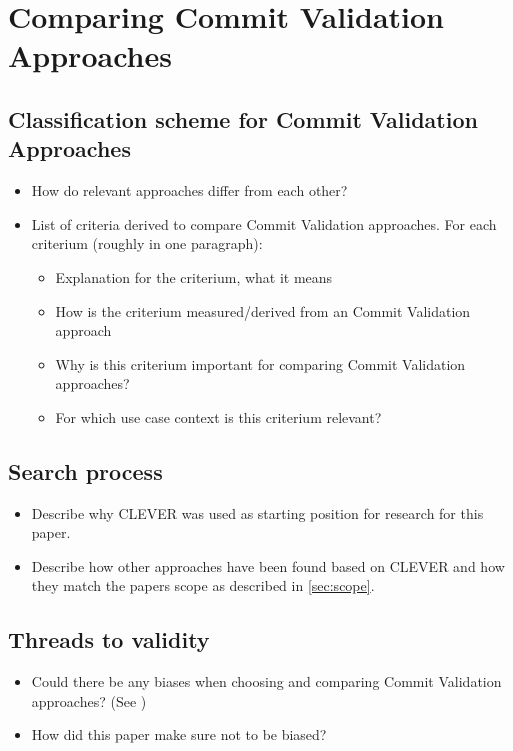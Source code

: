 

\section{Comparing Commit Validation Approaches}

\subsection{Classification scheme for Commit Validation Approaches}
\label{sec:scheme}
\begin{itemize}
	\item How do relevant approaches differ from each other?
	\item List of criteria derived to compare Commit Validation approaches. For each criterium (roughly in one paragraph):
	\begin{itemize}
		\item Explanation for the criterium, what it means
		\item How is the criterium measured/derived from an Commit Validation approach
		\item Why is this criterium important for comparing Commit Validation approaches?
		\item For which use case context is this criterium relevant?
	\end{itemize}
	
\end{itemize}

\subsection{Search process}
\begin{itemize}
	\item Describe why CLEVER was used as starting position for research for this paper. \cite{Nayrolles2018}
	\item Describe how other approaches have been found based on CLEVER and how they match the papers scope as described in \ref{sec:scope}.
\end{itemize}

\subsection{Threads to validity}
\begin{itemize}
	\item Could there be any biases when choosing and comparing Commit Validation approaches? (See \cite{Kitchenham2004})
	\item How did this paper make sure not to be biased?
\end{itemize}


